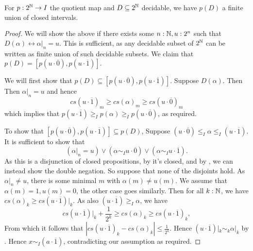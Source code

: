 \begin{lemma}\label{ImageDecidableClosedInterval}
  For $p:2^{\mathbb{N}} \to I$ the quotient map and $D\subseteq 2^{\mathbb{N}}$ decidable, we have $p(D)$ a finite union of closed intervals. 
\end{lemma}
\begin{proof}
  We will show the above if there exists some $n:\mathbb{N}, u:2^n$ such that $D(\alpha) \leftrightarrow \alpha|_n = u$.
  This is sufficient, as any decidable subset of $2^{\mathbb{N}}$ can be written as finite union of such decidable subsets. 
  We claim that $p(D) = [p(u\cdot \overline 0) , p(u \cdot \overline 1)]$. 
\item 
  We will first show that $p(D) \subseteq [p(u\cdot \overline 0) , p(u \cdot \overline 1)]$. 
  Suppose $D(\alpha)$. Then 
  Then $\alpha|_n = u$ and hence 
  \begin{equation}
    cs(u\cdot \overline 1)_m \geq 
    cs(\alpha)_m \geq 
    cs(u\cdot\overline 0)_m
  \end{equation}
 which implies that $p(u\cdot \overline 1) \geq_I p(\alpha) \geq_I p(u\cdot\overline 0)$, as required. 
\item 
  To show that $[p(u\cdot \overline 0) , p(u \cdot \overline 1)]\subseteq p(D)$, 
  Suppose
  $(u\cdot \overline 0) \leq_I \alpha \leq_I (u \cdot \overline 1)$. 
  It is sufficient to show that 
  $$(\alpha|_n = u )\vee (\alpha \sim_I u \cdot \overline 0 )\vee (\alpha \sim_I u \cdot \overline 1).$$
  As this is a disjunction of closed propositions, by  it's closed, and by 
  , we can instead show the double negation. 
  So suppose that none of the disjoints hold. 
  As $\alpha|_n \neq u$, there is some minimal $m$ with $\alpha(m) \neq u(m)$. 
  We assume that $\alpha(m) = 1, u(m) = 0$, the other case goes similarly. 
  Then for all $k:\mathbb{N}$, we have 
  $cs(\alpha)_k \geq cs(u \cdot \overline 1)|_k$. 
  As also 
  $(u\cdot \overline 1)\geq_I \alpha$, we have 
  $$cs(u \cdot \overline 1)|_k + \frac{1}{2^k} \geq cs(\alpha)_k \geq cs(u\cdot \overline 1)_k,$$
  From which it follows that $|cs(u\cdot\overline 1)_k - cs(\alpha)_k|\leq \frac{1}{2^k}$. 
  Hence $(u\cdot \overline 1)|_k \sim_k \alpha|_k$ by . 
  Hence $x\sim_I (a\cdot\overline 1)$, contradicting our assumption as required. 
\end{proof}

